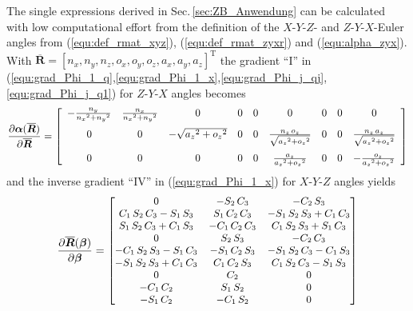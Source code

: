 \documentclass[robotics,article,submit,moreauthors,pdftex]{Definitions/mdpi}
\newcommand{\bm}[1]{\boldsymbol{#1}}
\newcommand{\transp}[0]{{\mathrm{T}}}
\begin{document}
The single expressions derived in Sec.\,\ref{sec:ZB_Anwendung} can be calculated with low computational effort from the definition of the $X$-$Y$-$Z$- and $Z$-$Y$-$X$-Euler angles from (\ref{equ:def_rmat_xyz}), (\ref{equ:def_rmat_zyxr}) and (\ref{equ:alpha_zyx}).
With $\overline{\bm{R}}=[n_x,n_y,n_z ,o_x,o_y,o_z,a_x,a_y,a_z]^\transp$ the gradient ``I'' in (\ref{equ:grad_Phi_1_q},\ref{equ:grad_Phi_1_x},\ref{equ:grad_Phi_j_qj},\ref{equ:grad_Phi_j_q1}) for $Z$-$Y$-$X$ angles becomes
%
\begin{equation}
\frac{\partial \bm{\alpha}(\overline{\bm{R}})}{\partial \overline{\bm{R}}}
=
\left[ \begin {array}{ccccccccc} -{\frac {{n_y}}{{{n_x}}^{2}+{{ n_y}}^{2}}}&{\frac {{n_x}}{{{n_x}}^{2}+{{n_y}}^{2}}}&0&0&0 &0&0&0&0\\ \noalign{\medskip}0&0&-\sqrt {{{a_z}}^{2}+{{o_z}}^{2} }&0&0&{\frac {{n_z}\,{o_z}}{\sqrt {{{a_z}}^{2}+{{o_z}}^{2} }}}&0&0&{\frac {{n_z}\,{a_z}}{\sqrt {{{a_z}}^{2}+{{o_z}}^{ 2}}}}\\ \noalign{\medskip}0&0&0&0&0&{\frac {{a_z}}{{{a_z}}^{2}+{ {o_z}}^{2}}}&0&0&-{\frac {{o_z}}{{{a_z}}^{2}+{{o_z}}^{2}}} \end {array} \right] 
\label{equ:alpha_xyz_diff_R}
\end{equation}
%
and the inverse gradient ``IV'' in (\ref{equ:grad_Phi_1_x}) for $X$-$Y$-$Z$ angles yields
%
\begin{align}
\frac{\partial \overline{\bm{R}}(\bm{\beta})}{\partial \bm{\beta}}
=
\small
\begin{bmatrix}
    0&-{ S_2}\,{ C_3}&-{ C_2}\,{ S_3}
    \\ { C_1}\,{ S_2}\,{ C_3}-{ S_1}\,{ S_3}&{
        S_1}\,{ C_2}\,{ C_3}&-{ S_1}\,{ S_2}\,{ S_3}+{ C_1}\,{
        C_3}\\ { S_1}\,{ S_2}\,{ C_3}+{ C_1}\,{
        S_3}&-{ C_1}\,{ C_2}\,{ C_3}&{ C_1}\,{ S_2}\,{ S_3}+{
        S_1}\,{ C_3}\\ 0&{ S_2}\,{ S_3}&-{ C_2}\,
    { C_3}\\ -{ C_1}\,{ S_2}\,{ S_3}-{ S_1}\,{
        C_3}&-{ S_1}\,{ C_2}\,{ S_3}&-{ S_1}\,{ S_2}\,{ C_3}-{
        C_1}\,{ S_3}\\ -{ S_1}\,{ S_2}\,{ S_3}+{
        C_1}\,{ C_3}&{ C_1}\,{ C_2}\,{ S_3}&{ C_1}\,{ S_2}\,{
        C_3}-{ S_1}\,{ S_3}\\ 0&{ C_2}&0
    \\ -{ C_1}\,{ C_2}&{ S_1}\,{ S_2}&0
    \\ -{ S_1}\,{ C_2}&-{ C_1}\,{ S_2}&0
    \end {bmatrix}
\label{equ:rotmat_diff_beta}
\end{align}
\end{document}
